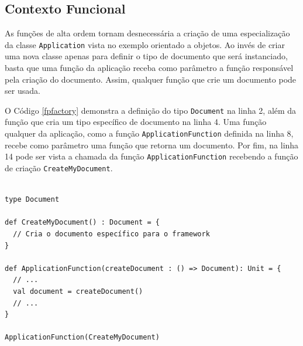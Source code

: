 \subsection*{Contexto Funcional}

As funções de alta ordem tornam desnecessária 
a criação de uma especialização da classe 
\texttt{Application} vista no exemplo orientado a 
objetos. Ao invés de criar uma nova classe 
apenas para definir o tipo de documento 
que será instanciado, basta que 
uma função da aplicação receba como parâmetro 
a função responsável pela criação do documento. 
Assim, qualquer função que crie um documento 
pode ser usada. 

O Código \ref{fpfactory} demonstra a definição 
do tipo \texttt{Document} na linha 2, além da função 
que cria um tipo específico de documento na 
linha 4. Uma função qualquer da aplicação, 
como a função \texttt{ApplicationFunction} 
definida na linha 8, recebe como parâmetro 
uma função que retorna um documento. Por 
fim, na linha 14 pode ser vista a chamada 
da função \texttt{ApplicationFunction} recebendo a 
função de criação \texttt{CreateMyDocument}.

\begin{lstlisting}[caption={Factory Method Funcional},label=fpfactory]
    
type Document

def CreateMyDocument() : Document = {
  // Cria o documento específico para o framework
}

def ApplicationFunction(createDocument : () => Document): Unit = {
  // ...
  val document = createDocument()
  // ...
}

ApplicationFunction(CreateMyDocument)

\end{lstlisting}

